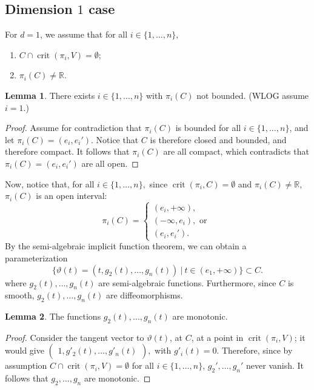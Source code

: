 \documentclass[10pt]{article}
\theoremstyle{definition}
\newtheorem{lemma}{Lemma}
\newcommand{\R}{\mathbb{R}}
\DeclareMathOperator{\crit}{crit}
\begin{document}
\subsection{Dimension $1$ case}
For $d=1$, we assume that for all $i \in \{1,\hdots,n\},$ 
%
\begin{enumerate}
    \item $C \cap \crit(\pi_i,V) = \emptyset$;
    \item $\pi_i(C) \not = \R$.
\end{enumerate}
%
%
\begin{lemma}\label{lemma:unboundedCoordinate}
    There exists $i \in \{1,\hdots,n\}$ with $\pi_i(C)$ not bounded. (WLOG assume $i=1.$)
\end{lemma}
%
%
\begin{proof}
Assume for contradiction that $\pi_i(C)$ is bounded for all $i \in \{1,\hdots,n\}$, and let $\pi_i(C) = (e_i,e_i').$
Notice that $C$ is therefore closed and bounded, and therefore compact. It follows that $\pi_i(C)$ are all compact, which contradicts that $\pi_i(C) = (e_i,e_i')$ are all open. 
\end{proof}
%
\noindent
Now, notice that, for all $i \in \{1,\hdots,n\},$ since $\crit(\pi_i,C) = \emptyset$ and $\pi_i(C) \not = \R$, $\pi_i(C)$ is an open interval:
\[
\pi_i(C)=
\begin{cases}
			(e_i,+\infty), \\
                (-\infty,e_i),\textrm{ or }\\
                (e_i,e_i').
\end{cases}
\]
By the semi-algebraic implicit function theorem, we can obtain a parameterization
\[
\big\{\vartheta(t) = \left(t,g_2(t),\hdots,g_n(t)\right)~|~ t \in (e_1,+\infty)\big\} \subset C.
\]
where $g_2(t),\hdots,g_n(t)$ are semi-algebraic functions. Furthermore, since $C$ is smooth, $g_2(t),\hdots,g_n(t)$ are diffeomorphisms.
%
\begin{lemma}
The functions $g_2(t),\hdots,g_n(t)$ are monotonic. 
\end{lemma}
%
%
\begin{proof}
Consider the tangent vector to $\vartheta(t)$,
at $C$, at a point in $\crit(\pi_i,V)$; it would give $
\begin{pmatrix}
    1, 
    g'_2(t), 
    \hdots, 
    g'_n(t)
\end{pmatrix},
$ with
$g'_i(t)=0.$ Therefore, since by assumption $C \cap \crit(\pi_i,V) = \emptyset$ for all $i \in \{1,\hdots,n\}$,
$g_2',\hdots,g_n'$ never vanish. It follows that $g_2,\hdots,g_n$ are  monotonic.
\end{proof}
\end{document}
